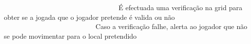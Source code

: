 ~\newline
~\newline
~\newline
~\newline
~\newline
~\newline
~\newline
~\newline
~\newline
~\newline
~\newline
~\newline
~\newline
~\newline
~\newline
~\newline
~\newline
~\newline
~\newline
~\newline
 É efectuada uma verificação na grid para obter se a jogada que o jogador pretende é valida ou não ~\newline
~\newline
~\newline
~\newline
~\newline
~\newline
~\newline
~\newline
~\newline
~\newline
~\newline
~\newline
~\newline
~\newline
~\newline
~\newline
~\newline
~\newline
~\newline
~\newline
~\newline
~\newline
~\newline
~\newline
~\newline
~\newline
~\newline
~\newline
~\newline
 Caso a verificação falhe, alerta ao jogador que não se pode movimentar para o local pretendido ~\newline
